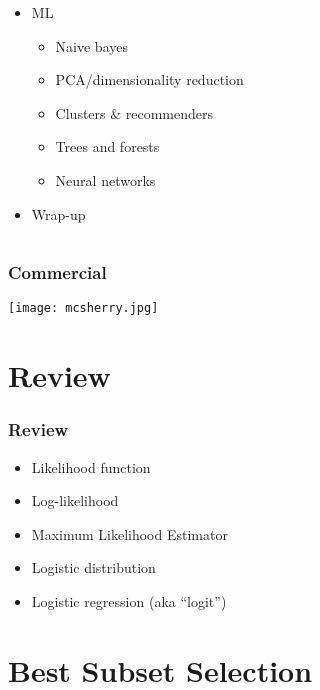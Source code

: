\documentclass[mathserif, xcolor=table, svgnames]{beamer}
\begin{document}
\begin{frame}
\begin{columns}
\begin{column}{0.5\linewidth}
\begin{itemize}
      \item ML
        \begin{itemize}
        \item Naive bayes
        \item PCA/dimensionality reduction
        \item Clusters \& recommenders
        \item Trees and forests
        \item Neural networks
        \end{itemize}
      \item Wrap-up
      \end{itemize}
    \end{column}
  \end{columns}
\end{frame}

\begin{frame}
  \frametitle{Commercial}
  \texttt{[image: mcsherry.jpg]}
\end{frame}

\section{Review}
\frame{\tableofcontents[currentsection]}

\begin{frame}
  \frametitle{Review}
  \begin{itemize}
  \item Likelihood function
  \item Log-likelihood
  \item Maximum Likelihood Estimator
  \item Logistic distribution
  \item Logistic regression (aka ``logit'')
  \end{itemize}
\end{frame}

\section{Best Subset Selection}
\frame{\tableofcontents[currentsection]}
\end{document}
